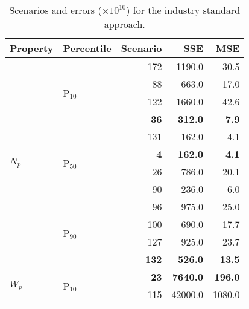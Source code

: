\begin{table}[H]
  \centering
  \caption[Errors for scenarios selected using the industry standard approach.]{Scenarios and errors ($\times 10^{10}$) for the industry standard approach.}
  \begin{tabular}{llrrr}
    \hline
    \textbf{Property}       & \textbf{Percentile}       & \textbf{Scenario} & \textbf{SSE}      & \textbf{MSE}   \\ \hline
    \multirow{12}{*}{$N_p$} & \multirow{4}{*}{P$_{10}$} & 172               & 1190.0          & 30.5           \\
                            &                           & 88                & 663.0          & 17.0           \\
                            &                           & 122               & 1660.0          & 42.6           \\
                            &                           & \textbf{36}       & \textbf{312.0} & \textbf{7.9}   \\ \cline{2-5} 
                            & \multirow{4}{*}{P$_{50}$} & 131               & 162.0          & 4.1            \\
                            &                           & \textbf{4}        & \textbf{162.0} & \textbf{4.1}   \\
                            &                           & 26                & 786.0          & 20.1           \\
                            &                           & 90                & 236.0          & 6.0            \\ \cline{2-5} 
                            & \multirow{4}{*}{P$_{90}$} & 96                & 975.0          & 25.0           \\
                            &                           & 100               & 690.0          & 17.7           \\
                            &                           & 127               & 925.0          & 23.7           \\
                            &                           & \textbf{132}      & \textbf{526.0} & \textbf{13.5}  \\ \hline
    \multirow{12}{*}{$W_p$} & \multirow{4}{*}{P$_{10}$} & \textbf{23}       & \textbf{7640.0} & \textbf{196.0} \\
                            &                           & 115               & 42000.0          & 1080.0         \\

\end{tabular}
\end{table}
